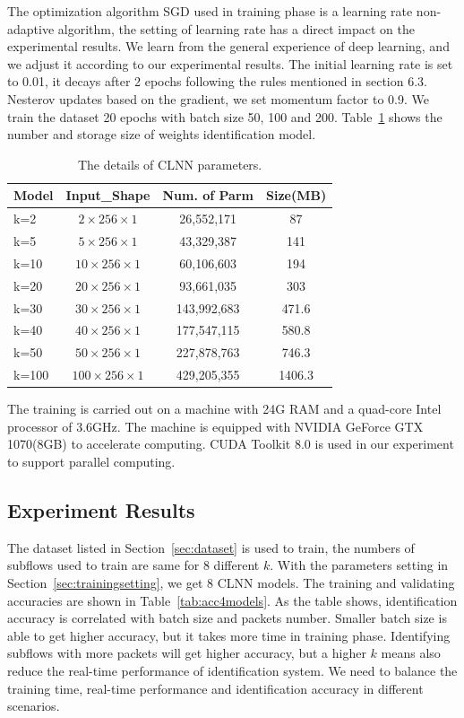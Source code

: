 \documentclass[conference]{IEEEtran}
\begin{document}
The optimization algorithm SGD used in training phase is a learning rate non-adaptive algorithm, the setting of learning rate has a direct impact on the experimental results. We learn from the general experience of deep learning, and we adjust it according to our experimental results. The initial learning rate is set to 0.01, it decays after 2 epochs following the rules mentioned in section 6.3. Nesterov updates based on the gradient, we set momentum factor to 0.9. We train the dataset 20 epochs with batch size 50, 100 and 200. Table~\ref{tab:params} shows the number and storage size of weights identification model.
\begin{table}
  \caption{The details of CLNN parameters.}
  \label{tab:params}
  \centering
  \begin{tabular}{l c c c}
    \hline
    \textbf{Model} & \textbf{Input\_Shape} & \textbf{Num. of Parm}&\textbf{Size(MB)}\\
    \hline
    k=2      & ${2 \times 256 \times 1}$  & 26,552,171  &87  \\
    k=5      & ${5 \times 256 \times 1}$  & 43,329,387  &141  \\
    k=10      & ${10 \times 256 \times 1}$  & 60,106,603  &194  \\
    k=20      & ${20 \times 256 \times 1}$  & 93,661,035  &303 \\
    k=30     & ${30 \times 256 \times 1}$  & 143,992,683  &471.6  \\
    k=40     & ${40 \times 256 \times 1}$  & 177,547,115  &580.8 \\
    k=50     & ${50 \times 256 \times 1}$  & 227,878,763  &746.3  \\
    k=100    & ${100 \times 256 \times 1}$  & 429,205,355  &1406.3  \\
    \hline
  \end{tabular}
\end{table}

The training is carried out on a machine with 24G RAM and a quad-core Intel processor of 3.6GHz. The machine is equipped with NVIDIA GeForce GTX 1070(8GB) to accelerate computing. CUDA Toolkit 8.0 is used in our experiment to support parallel computing.


\subsection{Experiment Results}
\label{sec:experimentresults}
The dataset listed in Section~\ref{sec:dataset} is used to train, the numbers of subflows used to train are same for 8 different $k$. With the parameters setting in Section~\ref{sec:trainingsetting}, we get 8 CLNN models. The training and validating accuracies are shown in Table~\ref{tab:acc4models}. As the table shows, identification accuracy is correlated with batch size and packets number. Smaller batch size is able to get higher accuracy, but it takes more time in training phase. Identifying subflows with more packets will get higher accuracy, but a higher $k$ means also reduce the real-time performance of identification system. We need to balance the training time, real-time performance and identification accuracy in different scenarios.
\end{document}
